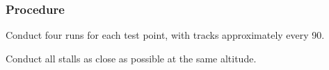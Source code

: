 % 
% 
%
 \subsubsection*{Procedure}
 \begin{compactenum}
   \item Conduct four runs for each test point, with tracks approximately every 90\textdegree.
   \item Conduct all stalls as close as possible at the same altitude.
   \end{compactenum}